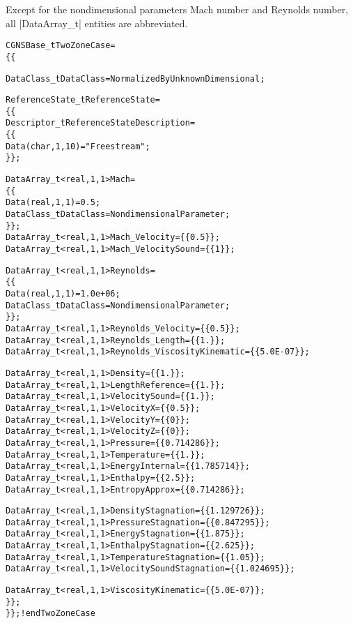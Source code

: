 Except for the nondimensional parameters Mach number and Reynolds number,
all |DataArray_t| entities are abbreviated.
\begin{alltt}
CGNSBase\_t TwoZoneCase =
  \{\{

  DataClass\_t DataClass = NormalizedByUnknownDimensional ;

  ReferenceState\_t ReferenceState = 
    \{\{
    Descriptor\_t ReferenceStateDescription =
      \{\{
      Data(char, 1, 10) = "Freestream" ;
      \}\} ;

    DataArray\_t<real, 1, 1> Mach =
      \{\{
      Data(real, 1, 1) = 0.5 ;
      DataClass\_t DataClass = NondimensionalParameter ;
      \}\} ;
    DataArray\_t<real, 1, 1> Mach\_Velocity      = \{\{ 0.5 \}\} ;
    DataArray\_t<real, 1, 1> Mach\_VelocitySound = \{\{ 1 \}\} ;

    DataArray\_t<real, 1, 1> Reynolds =
      \{\{
      Data(real, 1, 1) = 1.0e+06 ;
      DataClass\_t DataClass = NondimensionalParameter ;
      \}\} ;
    DataArray\_t<real, 1, 1> Reynolds\_Velocity           = \{\{ 0.5 \}\} ;
    DataArray\_t<real, 1, 1> Reynolds\_Length             = \{\{ 1. \}\} ;
    DataArray\_t<real, 1, 1> Reynolds\_ViscosityKinematic = \{\{ 5.0E-07 \}\} ;

    DataArray\_t<real, 1, 1> Density                 = \{\{ 1. \}\} ;
    DataArray\_t<real, 1, 1> LengthReference         = \{\{ 1. \}\} ;
    DataArray\_t<real, 1, 1> VelocitySound           = \{\{ 1. \}\} ;
    DataArray\_t<real, 1, 1> VelocityX               = \{\{ 0.5 \}\} ;
    DataArray\_t<real, 1, 1> VelocityY               = \{\{ 0 \}\};
    DataArray\_t<real, 1, 1> VelocityZ               = \{\{ 0 \}\} ;
    DataArray\_t<real, 1, 1> Pressure                = \{\{ 0.714286 \}\} ;
    DataArray\_t<real, 1, 1> Temperature             = \{\{ 1. \}\} ;
    DataArray\_t<real, 1, 1> EnergyInternal          = \{\{ 1.785714 \}\} ;
    DataArray\_t<real, 1, 1> Enthalpy                = \{\{ 2.5 \}\} ;
    DataArray\_t<real, 1, 1> EntropyApprox           = \{\{ 0.714286 \}\} ;

    DataArray\_t<real, 1, 1> DensityStagnation       = \{\{ 1.129726 \}\} ;
    DataArray\_t<real, 1, 1> PressureStagnation      = \{\{ 0.847295 \}\} ;
    DataArray\_t<real, 1, 1> EnergyStagnation        = \{\{ 1.875 \}\} ;
    DataArray\_t<real, 1, 1> EnthalpyStagnation      = \{\{ 2.625 \}\} ;
    DataArray\_t<real, 1, 1> TemperatureStagnation   = \{\{ 1.05 \}\} ;
    DataArray\_t<real, 1, 1> VelocitySoundStagnation = \{\{ 1.024695 \}\} ;

    DataArray\_t<real, 1, 1> ViscosityKinematic      = \{\{ 5.0E-07 \}\} ;
    \}\} ;
  \}\} ;          ! end TwoZoneCase
\end{alltt}

